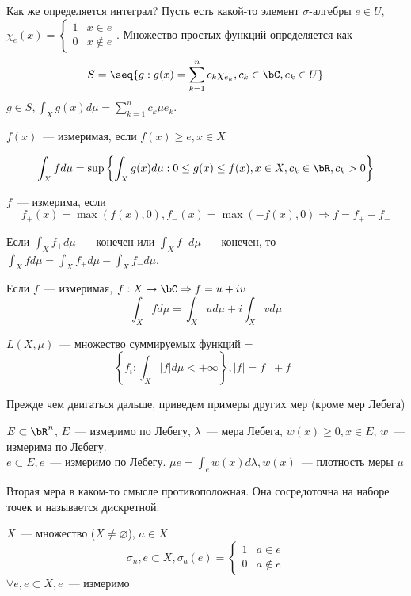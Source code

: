 \documentclass[document]{subfiles}
\begin{document}
Как же определяется интеграл?
Пусть есть какой-то элемент $\sigma$-алгебры $e \in U$, $\chi_e(x) = \begin{cases} 
    1 & x \in e \\
    0 & x \notin e
\end{cases}.$
Множество простых функций определяется как
\[S =  \seq{g : g(x) = \sum^n_{k=1} c_k \chi_{e_k}, c_k \in \bC, e_k \in U} \]
$g \in S, \int_X g(x) d\mu = \sum^n_{k=1} c_k \mu e_k$. 

$f(x)$~--- измеримая, если $f(x) \geq e, x \in X$

\begin{definition}
    \[ \int_X f d\mu
 = \sup \left\{ \int_X g(x) d\mu : 0 \leq g(x) \leq f(x), x \in X, c_k \in \bR, c_k > 0 \right\} \]    
\end{definition}

\begin{definition}
    $f$~--- измерима, если 
    \[f_+(x) = \max (f(x), 0), f_-(x) = \max(-f(x), 0) \Rightarrow f = f_+ - f_- \]
\end{definition}
Если $\int_X f_+ d\mu$~--- конечен или $\int_X f_- d\mu$~--- конечен, то $\int_X f d\mu = \int_X f_+ d\mu - \int_X f_- d\mu$.

Если $f$~--- измеримая, $f: X \rightarrow \bC \Rightarrow f = u + iv$
\[ \int_X f d\mu = \int_X u d\mu + i \int_X v d\mu \]
\begin{definition}
    $L(X, \mu)$~--- множество суммируемых функций =
    \[ \left\{ f_i : \int_X |f| d\mu < + \infty \right\}, |f| = f_+ + f_- \]
\end{definition}

Прежде чем двигаться дальше, приведем примеры других мер (кроме мер Лебега)
\begin{example}
    $E \subset \bR^n$, $E$~--- измеримо по Лебегу, $\lambda$~--- мера Лебега, $w(x) \geq 0, x \in E$, $w$~--- измерима по Лебегу. \\
    
    $e \subset E, e$~--- измеримо по Лебегу.
    $ \mu e = \int_e w(x) d \lambda, w(x)$~--- плотность меры $\mu$
\end{example}
Вторая мера в каком-то смысле противоположная. Она сосредоточна на наборе точек и называется дискретной.
\begin{example}
    $X$~--- множество ($X \ne \varnothing$), $a \in X$
    \[ \sigma_n, e \subset X, \sigma_a(e) = \begin{cases}
        1 & a \in e \\
        0 & a \notin e 
    \end{cases} \] 
    $\forall e, e \subset  X, e$~--- измеримо
\end{example}
\end{document}
